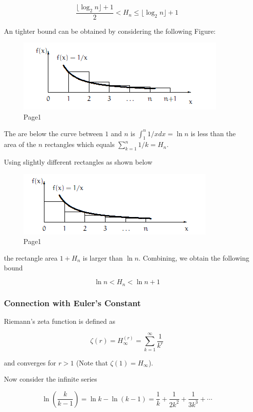 \[
\frac{\lfloor \log_2 n \rfloor + 1}{2} < H_n \leq \lfloor \log_2 n \rfloor + 1
\]

An tighter bound can be obtained by considering the following Figure:

\begin{figure}
\centering
\includegraphics{images/harmonic_series_1.png}
\caption{Page1}
\end{figure}

The are below the curve between \(1\) and \(n\) is \(\int_1^n 1/x dx = \ln n\) is less than the area of the \(n\) rectangles which equals \(\sum_{k=1}^n 1/k = H_n\).

Using slightly different rectangles as shown below

\begin{figure}
\centering
\includegraphics{images/harmonic_series_2.png}
\caption{Page1}
\end{figure}

the rectangle area \(1 + H_n\) is larger than \(\ln n\). Combining, we obtain the following bound

\[
\ln n < H_n < \ln n + 1
\]

\subsubsection{Connection with Euler's Constant}

Riemann's zeta function is defined as

\[
\zeta(r) = H_\infty^{(r)} = \sum_{k=1}^\infty \frac{1}{k^r}
\]

and converges for \(r > 1\) (Note that \(\zeta(1) = H_\infty\)).

Now consider the infinite series

\[
\ln \left( \frac{k}{k-1} \right) = \ln k - \ln(k-1) = \frac{1}{k} + \frac{1}{2k^2} + \frac{1}{3k^3} + \cdots
\]

